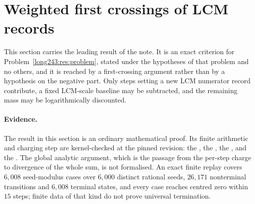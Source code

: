 \section{Weighted first crossings of LCM records}\label{long243:sec:lcmrecords}

This section carries the leading result of the note.  It is an exact criterion
for Problem~\ref{long243:res:problem}, stated under the hypotheses of that problem and
no others, and it is reached by a first-crossing argument rather than by a
hypothesis on the negative part.  Only steps setting a new LCM numerator record
contribute, a fixed LCM-scale baseline may be subtracted, and the remaining mass
may be logarithmically discounted.

\paragraph{Evidence.}
The result in this section is an ordinary mathematical proof.  Its finite
arithmetic and charging step are kernel-checked at the pinned revision: the
,
the
, the
, and
the
.  The global analytic argument, which is the passage from the per-step
charge to divergence of the whole sum, is not formalised.  An exact finite
replay covers $6{,}008$ seed-modulus cases over $6{,}000$ distinct rational
seeds, $26{,}171$ nonterminal transitions and $6{,}008$ terminal states, and
every case reaches centred zero within $15$ steps; finite data of that kind do
not prove universal termination.

